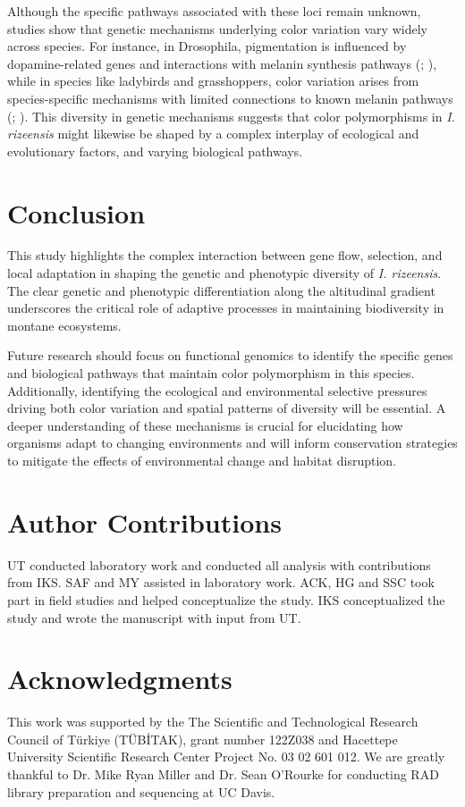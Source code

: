 \documentclass[9pt,a4paper,twoside]{rho-class/rho}
\begin{document}
        Although the specific pathways associated with these loci remain unknown, studies show that genetic mechanisms underlying color variation vary widely across species. For instance, in Drosophila, pigmentation is influenced by dopamine-related genes and interactions with melanin synthesis pathways (\cite{Wright1987}; \cite{Wittkopp2003}), while in species like ladybirds and grasshoppers, color variation arises from species-specific mechanisms with limited connections to known melanin pathways (\cite{MICHIE2010}; \cite{Bastide2016}). This diversity in genetic mechanisms suggests that color polymorphisms in \textit{I. rizeensis} might likewise be shaped by a complex interplay of ecological and evolutionary factors, and varying biological pathways.
\section{Conclusion}

    This study highlights the complex interaction between gene flow, selection, and local adaptation in shaping the genetic and phenotypic diversity of \textit{I. rizeensis}. The clear genetic and phenotypic differentiation along the altitudinal gradient underscores the critical role of adaptive processes in maintaining biodiversity in montane ecosystems.
    
    Future research should focus on functional genomics to identify the specific genes and biological pathways that maintain color polymorphism in this species. Additionally, identifying the ecological and environmental selective pressures driving both color variation and spatial patterns of diversity will be essential. A deeper understanding of these mechanisms is crucial for elucidating how organisms adapt to changing environments and will inform conservation strategies to mitigate the effects of environmental change and habitat disruption.

\section{Author Contributions}
UT conducted laboratory work and conducted all analysis with contributions from IKS. SAF and MY assisted in laboratory work. ACK, HG and SSC took part in field studies and helped conceptualize the study. IKS conceptualized the study and wrote the manuscript with input from UT.

\section{Acknowledgments}
This work was supported by the The Scientific and Technological Research Council of Türkiye (TÜBİTAK), grant number 122Z038 and Hacettepe University Scientific Research Center Project No. 03 02 601 012. We are greatly thankful to Dr. Mike Ryan Miller and Dr. Sean O'Rourke for conducting RAD library preparation and sequencing at UC Davis.  
\end{document}
